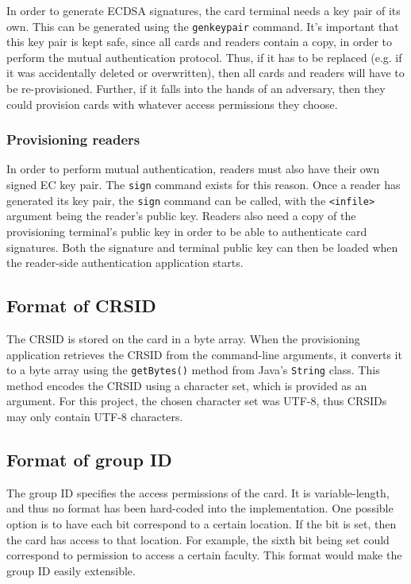 \documentclass[12pt,a4paper,twoside,openright]{report}
\begin{document}
In order to generate ECDSA signatures, the card terminal needs a key pair of its own. This can be generated using the \texttt{genkeypair} command. It's important that this key pair is kept safe, since all cards and readers contain a copy, in order to perform the mutual authentication protocol. Thus, if it has to be replaced (e.g. if it was accidentally deleted or overwritten), then all cards and readers will have to be re-provisioned. Further, if it falls into the hands of an adversary, then they could provision cards with whatever access permissions they choose.

\subsubsection{Provisioning readers}

In order to perform mutual authentication, readers must also have their own signed EC key pair. The \texttt{sign} command exists for this reason. Once a reader has generated its key pair, the \texttt{sign} command can be called, with the \texttt{<infile>} argument being the reader's public key. Readers also need a copy of the provisioning terminal's public key in order to be able to authenticate card signatures. Both the signature and terminal public key can then be loaded when the reader-side authentication application starts.

\subsection{Format of CRSID}

The CRSID is stored on the card in a byte array. When the provisioning application retrieves the CRSID from the command-line arguments, it converts it to a byte array using the \texttt{getBytes()} method from Java's \texttt{String} class. This method encodes the CRSID using a character set, which is provided as an argument. For this project, the chosen character set was UTF-8, thus CRSIDs may only contain UTF-8 characters.

\subsection{Format of group ID}

The group ID specifies the access permissions of the card. It is variable-length, and thus no format has been hard-coded into the implementation. One possible option is to have each bit correspond to a certain location. If the bit is set, then the card has access to that location. For example, the sixth bit being set could correspond to permission to access a certain faculty. This format would make the group ID easily extensible.
\end{document}
